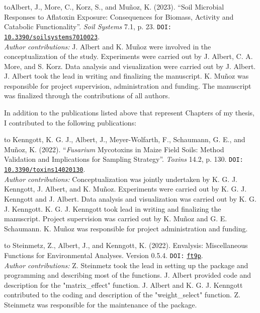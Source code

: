 \clearpage
 

{\parindent2cm \hangindent\parindent\noindent\hbox toAlbert, J., More, C., Korz, S., and Muñoz, K. (2023). “Soil Microbial Responses to Aflatoxin Exposure: Consequences for Biomass, Activity and Catabolic Functionality”. \textit{Soil Systems} 7.1, p. 23. \texttt{DOI:} \href{https://www.mdpi.com/2571-8789/7/1/23}{\texttt{10.3390/soilsystems7010023}}. \nocite{albert2023soil}\\[5pt]
\textit{Author contributions:} J. Albert and K. Muñoz were involved in the conceptualization of the study. Experiments were carried out by J. Albert, C. A. More, and S. Korz. Data analysis and visualization were carried out by J. Albert. J. Albert took the lead in writing and finalizing the manuscript. K. Muñoz was responsible for project supervision, administration and funding. The manuscript was finalized through the contributions of all authors. \par}

\hfill 

\noindent
In addition to the publications listed above that represent Chapters of my thesis, I contributed to the following publications:

{\parindent2cm \hangindent\parindent\noindent\hbox to Kenngott, K. G. J., Albert, J., Meyer-Wolfarth, F., Schaumann, G. E., and Muñoz, K. (2022). “\textit{Fusarium} Mycotoxins in Maize Field Soils: Method Validation and Implications for Sampling Strategy”. \textit{Toxins} 14.2, p. 130. \texttt{DOI:} \href{https://www.mdpi.com/2072-6651/14/2/130}{\texttt{10.3390/toxins14020130}}.\\[5pt]
\textit{Author contributions:} Conceptualization was jointly undertaken by K. G. J. Kenngott, J. Albert, and K. Muñoz. Experiments were carried out by K. G. J. Kenngott and J. Albert. Data analysis and visualization was carried out by K. G. J. Kenngott. K. G. J. Kenngott took lead in writing and finalizing the manuscript. Project supervision was carried out by  K. Muñoz and G. E. Schaumann. K. Muñoz was responsible for project administration and funding.
\par}


{\parindent2cm \hangindent\parindent\noindent\hbox to Steinmetz, Z., Albert, J., and Kenngott, K. (2022). Envalysis: Miscellaneous Functions for Environmental Analyses. Version 0.5.4. \texttt{DOI:} \href{https://doi.org/ft9p}{\texttt{ft9p}}. \nocite{steinmetz2021envalysis}\\[5pt] 
\textit{Author contributions:} Z. Steinmetz took the lead in setting up the package and programming and describing most of the functions. J. Albert provided code and description for the "matrix\_effect" function. J. Albert and K. G. J. Kenngott contributed to the coding and description of the "weight\_select" function. Z. Steinmetz was responsible for the maintenance of the package.
\par}
